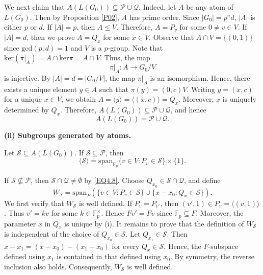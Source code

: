 \documentclass[12pt]{article}
\begin{document}
We next claim that $A(L(G_0))\subseteq\mathcal{P}\cup \mathcal{Q}$.
Indeed, let $A$ be any atom of $L(G_0)$. Then by Proposition \ref{P02}, $A$ has prime order. Since $|G_0|=p^n d$, $|A|$ is either $p$ or $d$. 
If $|A|=p$, then $A\leq V$. Therefore, $A=P_v$ for some $0\neq v\in V$. If $|A|=d$, then we prove $A=Q_x$ for some $x\in V$. 
Observe that $A\cap V=\{(0,1)\}$ since $\mbox{gcd}(p,d)=1$ and $V$ is a $p$-group. 
Note that $\mbox{ker}(\pi|_A)=A\cap \mbox{ker}\pi = A\cap V$.
Thus, the map $$\pi|_{A}: A\longrightarrow G_0/V$$ is injective. 
By $|A|=d=|G_0/V|$, the map $\pi|_{A}$ is an isomorphism. 
Hence, there exists a unique element $y\in A$ such 
that $\pi(y)=(0,c)V$. Writing $y=(x,c)$ for a unique $x\in V$, we obtain
$A=\langle y \rangle=\langle (x,c)\rangle=Q_x$.
Moreover, $x$ is uniquely determined by $Q_x$. 
Therefore, $A(L(G_0))\subseteq\mathcal{P}\cup \mathcal{Q}$, and hence
\begin{equation}\label{EQ4.8}
A(L(G_0))=\mathcal{P}\cup \mathcal{Q}.
\end{equation}


\textbf{(ii) Subgroups generated by atoms.}

Let $\mathcal{S}\subseteq A(L(G_0))$. If $\mathcal{S}\subseteq \mathcal{P}$, then
\begin{equation}\label{eqqq10} 
\langle \mathcal{S} \rangle=\mbox{span}_{\mathbb{F}_p}\{v\in V:P_v\in \mathcal{S}\}\times \{1\}.
\end{equation}

If $\mathcal{S}\nsubseteq \mathcal{P}$, then $\mathcal{S}\cap \mathcal{Q}\neq \emptyset$ by \eqref{EQ4.8}. Choose $Q_{x_0}\in \mathcal{S}\cap \mathcal{Q}$, and define
\begin{equation*}\label{eqqq11} 
W_{\mathcal{S}}=\mbox{span}_{F}(\{v\in V:P_v\in \mathcal{S}\}\cup \{x-x_0:Q_x\in \mathcal{S}\}).
\end{equation*}
We first verify that $W_{\mathcal{S}}$ is well defined.
If $P_v=P_{v'}$, then $(v',1)\in P_v=\langle(v,1)\rangle$. 
Thus $v'=kv$ for some $k\in\mathbb{F}_p^\times$.
Hence $Fv'=Fv$ since $\mathbb{F}_p\subseteq F$.
Moreover, the parameter $x$ in $Q_x$ is unique by (i). It remains to prove 
that the definition of $W_{\mathcal{S}}$ is independent of the choice of $Q_{x_0}\in\mathcal{S}$. 
Let $Q_{x_1}\in\mathcal{S}$. Then $x-x_1=(x-x_0)-(x_1-x_0)$
for every $Q_{x}\in\mathcal{S}$.
Hence, the $F$-subspace defined using $x_1$ is contained 
in that defined using $x_0$. By symmetry, 
the reverse inclusion also holds.
Consequently, $W_{\mathcal{S}}$ is well defined.
\end{document}
